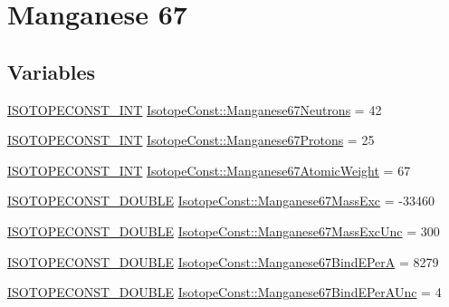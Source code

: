 \hypertarget{group___isotope_const-_manganese-_mn67}{}\section{Manganese 67}
\label{group___isotope_const-_manganese-_mn67}
\subsection*{Variables}
\begin{DoxyCompactItemize}
\item 
\mbox{\hyperlink{group___isotope_const-_macros_ga5f18360b3e99483a35c32d789e62621c}{I\+S\+O\+T\+O\+P\+E\+C\+O\+N\+S\+T\+\_\+\+I\+NT}} \mbox{\hyperlink{group___isotope_const-_manganese-_mn67_ga2e691cb970a09b39563063ea0d2638f2}{Isotope\+Const\+::\+Manganese67\+Neutrons}} = 42
\item 
\mbox{\hyperlink{group___isotope_const-_macros_ga5f18360b3e99483a35c32d789e62621c}{I\+S\+O\+T\+O\+P\+E\+C\+O\+N\+S\+T\+\_\+\+I\+NT}} \mbox{\hyperlink{group___isotope_const-_manganese-_mn67_ga4d195bbfa3011e8237457aa5822ae17c}{Isotope\+Const\+::\+Manganese67\+Protons}} = 25
\item 
\mbox{\hyperlink{group___isotope_const-_macros_ga5f18360b3e99483a35c32d789e62621c}{I\+S\+O\+T\+O\+P\+E\+C\+O\+N\+S\+T\+\_\+\+I\+NT}} \mbox{\hyperlink{group___isotope_const-_manganese-_mn67_ga12650bc4cd8680b6becf8f33ae625587}{Isotope\+Const\+::\+Manganese67\+Atomic\+Weight}} = 67
\item 
\mbox{\hyperlink{group___isotope_const-_macros_ga8f45a7272ce02c0b4c65c44636ed719a}{I\+S\+O\+T\+O\+P\+E\+C\+O\+N\+S\+T\+\_\+\+D\+O\+U\+B\+LE}} \mbox{\hyperlink{group___isotope_const-_manganese-_mn67_ga4ab1708b8ee16079676ca223592b98f1}{Isotope\+Const\+::\+Manganese67\+Mass\+Exc}} = -\/33460
\item 
\mbox{\hyperlink{group___isotope_const-_macros_ga8f45a7272ce02c0b4c65c44636ed719a}{I\+S\+O\+T\+O\+P\+E\+C\+O\+N\+S\+T\+\_\+\+D\+O\+U\+B\+LE}} \mbox{\hyperlink{group___isotope_const-_manganese-_mn67_ga4306ee55e923fe86c449ef82bf89e56e}{Isotope\+Const\+::\+Manganese67\+Mass\+Exc\+Unc}} = 300
\item 
\mbox{\hyperlink{group___isotope_const-_macros_ga8f45a7272ce02c0b4c65c44636ed719a}{I\+S\+O\+T\+O\+P\+E\+C\+O\+N\+S\+T\+\_\+\+D\+O\+U\+B\+LE}} \mbox{\hyperlink{group___isotope_const-_manganese-_mn67_ga7cdc329a88ec824ff164b93b5e2186f9}{Isotope\+Const\+::\+Manganese67\+Bind\+E\+PerA}} = 8279
\item 
\mbox{\hyperlink{group___isotope_const-_macros_ga8f45a7272ce02c0b4c65c44636ed719a}{I\+S\+O\+T\+O\+P\+E\+C\+O\+N\+S\+T\+\_\+\+D\+O\+U\+B\+LE}} \mbox{\hyperlink{group___isotope_const-_manganese-_mn67_ga56cd1371b2aaf8a99fabf4538ca1f9f5}{Isotope\+Const\+::\+Manganese67\+Bind\+E\+Per\+A\+Unc}} = 4

\end{DoxyCompactItemize}
